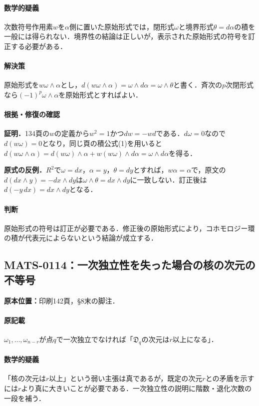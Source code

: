 \documentclass[a4paper,10pt]{ltjsarticle}
\begin{document}
\paragraph{数学的疑義}次数符号作用素$w$を$\alpha$側に置いた原始形式では，閉形式$\omega$と境界形式$\theta=d\alpha$の積を一般には得られない．境界性の結論は正しいが，表示された原始形式の符号を訂正する必要がある．

\paragraph{解決策}原始形式を$w\omega\wedge\alpha$とし，$d(w\omega\wedge\alpha)=\omega\wedge d\alpha=\omega\wedge\theta$と書く．斉次の$p$次閉形式なら$(-1)^p\omega\wedge\alpha$を原始形式とすればよい．

\paragraph{根拠・修復の確認}\textbf{証明．}134頁の$w$の定義から$w^2=1$かつ$dw=-wd$である．$d\omega=0$なので$d(w\omega)=0$となり，同じ頁の積公式(1)を用いると$d(w\omega\wedge\alpha)=d(w\omega)\wedge\alpha+w(w\omega)\wedge d\alpha=\omega\wedge d\alpha$を得る．\par\textbf{原式の反例．}$R^2$で$\omega=dx$，$\alpha=y$，$\theta=dy$とすれば，$w\alpha=\alpha$で，原文の$d(dx\wedge y)=-dx\wedge dy$は$\omega\wedge\theta=dx\wedge dy$に一致しない．訂正後は$d(-y\,dx)=dx\wedge dy$となる．

\paragraph{判断}原始形式の符号は訂正が必要である．修正後の原始形式により，コホモロジー環の積が代表元によらないという結論が成立する．


\subsection*{MATS-0114：一次独立性を失った場合の核の次元の不等号}\label{math:MATS-0114}
\noindent\textbf{原本位置：}印刷142頁，§8末の脚注．

\paragraph{原記載}$\omega_1,\ldots,\omega_{n-r}$が点$q$で一次独立でなければ「$\mathfrak D_q$の次元は$r$以上になる」．

\paragraph{数学的疑義}「核の次元は$r$以上」という弱い主張は真であるが，既定の次元$r$との矛盾を示すには$r$より真に大きいことが必要である．一次独立性の説明に階数・退化次数の一段を補う．
\end{document}
